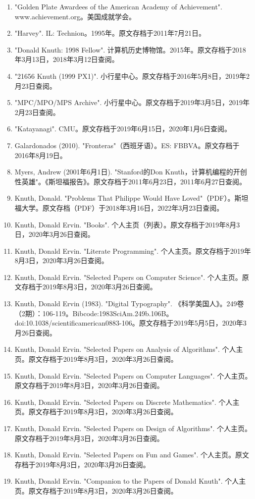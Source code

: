 \begin{enumerate}
\item "Golden Plate Awardees of the American Academy of Achievement". www.achievement.org。美国成就学会。
\item "Harvey". IL: Technion。1995年。原文存档于2011年7月21日。
\item "Donald Knuth: 1998 Fellow". 计算机历史博物馆。2015年。原文存档于2018年3月13日，2018年3月12日查阅。
\item "21656 Knuth (1999 PX1)". 小行星中心。原文存档于2016年5月8日，2019年2月23日查阅。
\item "MPC/MPO/MPS Archive". 小行星中心。原文存档于2019年3月5日，2019年2月23日查阅。
\item "Katayanagi". CMU。原文存档于2019年6月15日，2020年1月6日查阅。
\item Galardonados (2010). "Fronteras"（西班牙语）。ES: FBBVA。原文存档于2016年8月19日。
\item Myers, Andrew (2001年6月1日). "Stanford的Don Knuth，计算机编程的开创性英雄"。《斯坦福报告》。原文存档于2011年6月23日，2011年6月27日查阅。
\item Knuth, Donald. "Problems That Philippe Would Have Loved"（PDF）。斯坦福大学。原文存档（PDF）于2018年3月16日，2022年3月23日查阅。
\item Knuth, Donald Ervin. "Books". 个人主页（列表）。原文存档于2019年8月3日，2020年3月26日查阅。
\item Knuth, Donald Ervin. "Literate Programming". 个人主页。原文存档于2019年8月3日，2020年3月26日查阅。
\item Knuth, Donald Ervin. "Selected Papers on Computer Science". 个人主页。原文存档于2019年8月3日，2020年3月26日查阅。
\item Knuth, Donald Ervin (1983). "Digital Typography". 《科学美国人》。249卷（2期）：106-119。Bibcode:1983SciAm.249b.106B。doi:10.1038/scientificamerican0883-106。原文存档于2019年5月5日，2020年3月26日查阅。
\item Knuth, Donald Ervin. "Selected Papers on Analysis of Algorithms". 个人主页。原文存档于2019年8月3日，2020年3月26日查阅。
\item Knuth, Donald Ervin. "Selected Papers on Computer Languages". 个人主页。原文存档于2019年8月3日，2020年3月26日查阅。
\item Knuth, Donald Ervin. "Selected Papers on Discrete Mathematics". 个人主页。原文存档于2019年8月3日，2020年3月26日查阅。
\item Knuth, Donald Ervin. "Selected Papers on Design of Algorithms". 个人主页。原文存档于2019年8月3日，2020年3月26日查阅。
\item Knuth, Donald Ervin. "Selected Papers on Fun and Games". 个人主页。原文存档于2019年8月3日，2020年3月26日查阅。
\item Knuth, Donald Ervin. "Companion to the Papers of Donald Knuth". 个人主页。原文存档于2019年8月3日，2020年3月26日查阅。
\end{enumerate}
